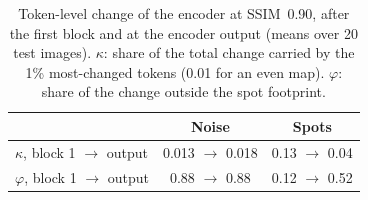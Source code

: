 \begin{table}[t]
  \caption{Token-level change of the encoder at SSIM~0.90, after the first block and at the encoder output
  (means over 20 test images). $\kappa$: share of the total change carried by the 1\% most-changed tokens
  (0.01 for an even map). $\varphi$: share of the change outside the spot footprint.}
  \label{tab:mechanism}
  \centering\small
  \begin{tabular}{lcc}
    \toprule
    & Noise & Spots \\
    \midrule
    $\kappa$, block 1 $\rightarrow$ output   & 0.013 $\rightarrow$ 0.018 & 0.13 $\rightarrow$ 0.04 \\
    $\varphi$, block 1 $\rightarrow$ output  & 0.88 $\rightarrow$ 0.88   & 0.12 $\rightarrow$ 0.52 \\
    \bottomrule
  \end{tabular}
\end{table}
